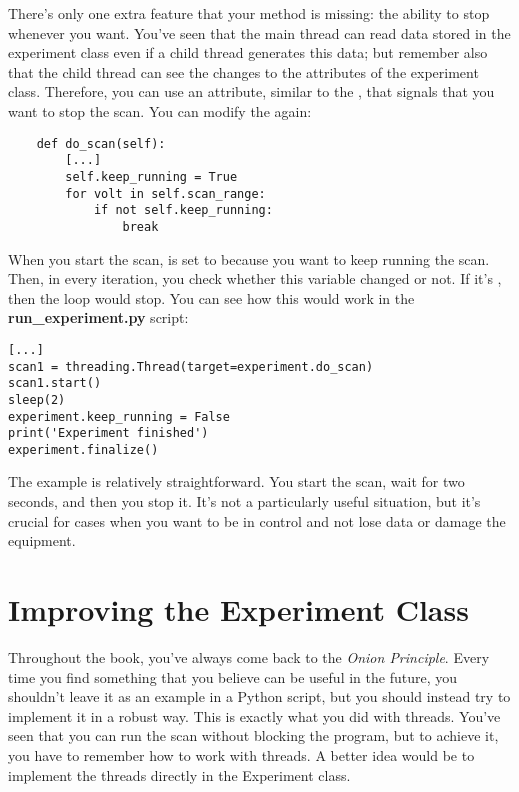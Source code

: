 There's only one extra feature that your  method is missing: the ability to stop whenever you want. You've seen that the main thread can read data stored in the experiment class even if a child thread generates this data; but remember also that the child thread can see the changes to the attributes of the experiment class. Therefore, you can use an attribute, similar to the , that signals that you want to stop the scan. You can modify the  again:

\begin{verbatim}
    def do_scan(self):
        [...]
        self.keep_running = True
        for volt in self.scan_range:
            if not self.keep_running:
                break
\end{verbatim}
When you start the scan,  is set to  because you want to keep running the scan. Then, in every iteration, you check whether this variable changed or not. If it's , then the loop would stop. You can see how this would work in the \textbf{run\_experiment.py} script:

\begin{verbatim}
[...]
scan1 = threading.Thread(target=experiment.do_scan)
scan1.start()
sleep(2)
experiment.keep_running = False
print('Experiment finished')
experiment.finalize()
\end{verbatim}

The example is relatively straightforward. You start the scan, wait for two seconds, and then you stop it. It's not a particularly useful situation, but it's crucial for cases when you want to be in control and not lose data or damage the equipment.


\section{Improving the Experiment Class}\label{sec:improving-experiment}
Throughout the book, you've always come back to the \emph{Onion Principle}. Every time you find something that you believe can be useful in the future, you shouldn't leave it as an example in a Python script, but you should instead try to implement it in a robust way. This is exactly what you did with threads. You've seen that you can run the scan without blocking the program, but to achieve it, you have to remember how to work with threads. A better idea would be to implement the threads directly in the Experiment class.

